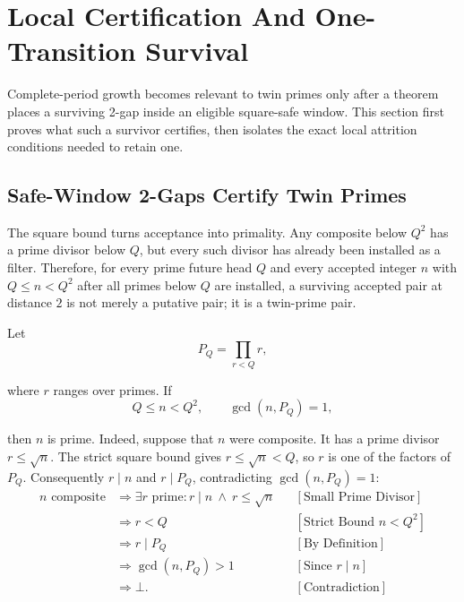 \section{Local Certification And One-Transition Survival}
\label{sec:local-certification}

Complete-period growth becomes relevant to twin primes only after a theorem
places a surviving 2-gap inside an eligible square-safe window. This section
first proves what such a survivor certifies, then isolates the exact local
attrition conditions needed to retain one.

\subsection{Safe-Window 2-Gaps Certify Twin Primes}
\label{sec:safe-window-certify-twin-primes}

The square bound turns acceptance into primality. Any composite below $Q^2$
has a prime divisor below $Q$, but every such divisor has already been
installed as a filter. Therefore, for every prime future head $Q$ and every
accepted integer $n$ with $Q\le n\lt Q^2$ after all primes below $Q$ are
installed, a surviving accepted pair at distance $2$ is not merely a
putative pair; it is a twin-prime pair.

Let
\begin{equation*}
P_Q=\prod_{r\lt Q}r,
\end{equation*}

where $r$ ranges over primes. If
\begin{equation*}
Q\le n\lt Q^2,
\qquad
\gcd(n,P_Q)=1,
\end{equation*}

then $n$ is prime. Indeed, suppose that $n$ were composite. It has a prime
divisor $r\le\sqrt n$. The strict square bound gives
$r\le\sqrt n\lt Q$, so $r$ is one of the factors of $P_Q$. Consequently
$r\mid n$ and $r\mid P_Q$, contradicting $\gcd(n,P_Q)=1$:
\begin{equation*}
\begin{aligned}
n\text{ composite}
&\Longrightarrow
\exists r\text{ prime}:r\mid n\ \land\ r\le\sqrt n
&&[\text{Small Prime Divisor}]\\
&\Longrightarrow r\lt Q
&&[\text{Strict Bound }n\lt Q^2]\\
&\Longrightarrow r\mid P_Q
&&[\text{By Definition}]\\
&\Longrightarrow \gcd(n,P_Q)>1
&&[\text{Since }r\mid n]\\
&\Longrightarrow \bot.
&&[\text{Contradiction}]
\end{aligned}
\end{equation*}

